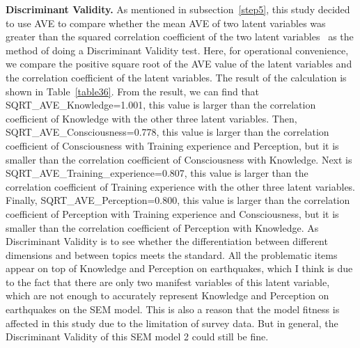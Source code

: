 \textbf{Discriminant Validity.} As mentioned in subsection~\ref{step5}, this study decided to use AVE to compare whether the mean AVE of two latent variables was greater than the squared correlation coefficient of the two latent variables~\cite{ref31} as the method of doing a Discriminant Validity test. Here, for operational convenience, we compare the positive square root of the AVE value of the latent variables and the correlation coefficient of the latent variables. The result of the calculation is shown in Table~\ref{table36}. From the result, we can find that SQRT\_AVE\_Knowledge=1.001, this value is larger than the correlation coefficient of Knowledge with the other three latent variables. Then, SQRT\_AVE\_Consciousness=0.778, this value is larger than the correlation coefficient of Consciousness with Training experience and Perception, but it is smaller than the correlation coefficient of Consciousness with Knowledge. Next is SQRT\_AVE\_Training\_experience=0.807, this value is larger than the correlation coefficient of Training experience with the other three latent variables. Finally, SQRT\_AVE\_Perception=0.800, this value is larger than the correlation coefficient of Perception with Training experience and Consciousness, but it is smaller than the correlation coefficient of Perception with Knowledge. As Discriminant Validity is to see whether the differentiation between different dimensions and between topics meets the standard. All the problematic items appear on top of Knowledge and Perception on earthquakes, which I think is due to the fact that there are only two manifest variables of this latent variable, which are not enough to accurately represent Knowledge and Perception on earthquakes on the SEM model. This is also a reason that the model fitness is affected in this study due to the limitation of survey data. But in general, the Discriminant Validity of this SEM model 2 could still be fine.

